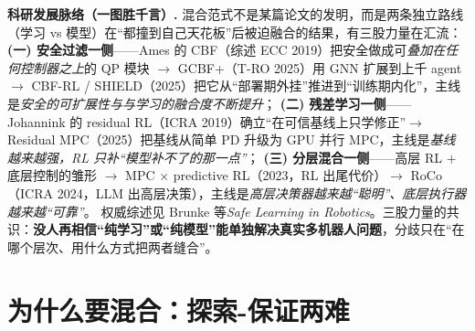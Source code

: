\begin{note}
\textbf{科研发展脉络（一图胜千言）.}\;
混合范式不是某篇论文的发明，而是两条独立路线（学习 vs 模型）在“都撞到自己天花板”后被迫融合的结果，有三股力量在汇流：
\textbf{(一) 安全过滤一侧}——Ames 的 CBF（综述 ECC 2019\cite{ames2019cbf}）把安全做成可\emph{叠加在任何控制器之上}的 QP 模块 $\to$ GCBF+（T-RO 2025\cite{zhang2025gcbfplus}）用 GNN 扩展到上千 agent $\to$ CBF-RL / SHIELD（2025\cite{gandhi2023shield,yin2023shield}）把它从“部署期外挂”推进到“训练期内化”，主线是\emph{安全的可扩展性与与学习的融合度不断提升}；
\textbf{(二) 残差学习一侧}——Johannink 的 residual RL（ICRA 2019\cite{johannink2019residual}）确立“在可信基线上只学修正”$\to$ Residual MPC（2025\cite{residualmpc2025}）把基线从简单 PD 升级为 GPU 并行 MPC，主线是\emph{基线越来越强，RL 只补“模型补不了的那一点”}；
\textbf{(三) 分层混合一侧}——高层 RL $+$ 底层控制的雏形 %
$\to$ MPC $\times$ predictive RL（2023\cite{kovalev2023mpcrl}，RL 出尾代价）$\to$ RoCo（ICRA 2024\cite{mandi2024roco}，LLM 出高层决策），主线是\emph{高层决策器越来越“聪明”、底层执行器越来越“可靠”}。
权威综述见 Brunke 等\emph{Safe Learning in Robotics}\cite{brunke2022safe}。三股力量的共识：\textbf{没人再相信“纯学习”或“纯模型”能单独解决真实多机器人问题}，分歧只在“在哪个层次、用什么方式把两者缝合”。
\end{note}

\section{为什么要混合：探索-保证两难}
\label{sec:mh-why}


